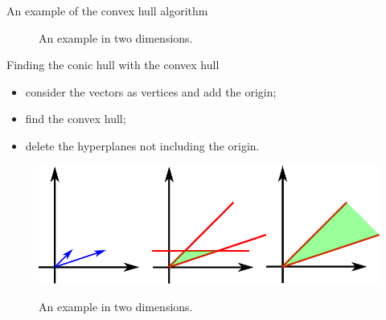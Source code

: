 \begin{frame}{An example of the convex hull algorithm}
\begin{figure}

An example in two dimensions.
\end{figure}
\end{frame}

\begin{frame}{Finding the conic hull with the convex hull}
\begin{itemize}
\item consider the vectors as vertices and add the origin;
\item find the convex hull;
\item delete the hyperplanes not including the origin.
\end{itemize}
\begin{figure}
\includegraphics[scale=1]{images/conehull.eps}

An example in two dimensions.
\end{figure}
\end{frame}

